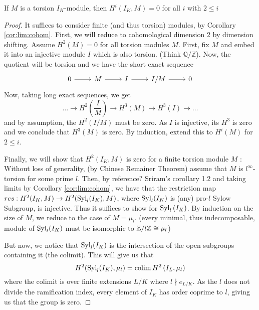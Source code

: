 \begin{proposition} \coproof
		 If \(M\) is a torsion \(I_{K}\)-module, then
			\(H^{i}(I_{K},M) = 0\) for all \(i\) with \(2 \leq i\)
\end{proposition}

\begin{proof}
			It suffices to consider
			finite (and thus torsion) modules, by Corollary \ref{cor:lim:cohom}.
			First, we will reduce to cohomological dimension 2 by dimension
			shifting. 
			Assume \(H^{2}(M) = 0\) for all torsion modules \(M\).
			First, fix \(M\) and embed it into an injective module \(I\) 
			which is also torsion.
			(Think \(\mathbb{Q} / \mathbb{Z}\)).
			Now, the quotient will be torsion and we have the short exact sequence
			\[
			\begin{tikzcd}
			0 \arrow{r}{} & M \arrow{r}{} & 
			I \arrow{r}{} & I / M \arrow{r}{} & 0
			\end{tikzcd}
			\]
			Now, taking long exact sequences, we get
			\[
				\ldots \to H^{2}(\frac{I}{M}) \to 
				H^{3}(M) \to H^{3}(I) \to \ldots
			\] 
			and by assumption, the \(H^{2}(I / M)\) must be zero.
			As \(I\) is injective, its \(H^{3}\) is zero and we conclude
			that \(H^{3}(M)\) is zero. 
			By induction, extend this to \(H^{i}(M)\) for \(2 \leq i\).

			Finally, we will show that \(H^{2}(I_{K},M)\) is zero 
			for a finite torsion module \(M\) :
			Without loss of generality, (by Chinese Remainer Theorem)
			assume that \(M\) is \(l^{\infty}\)-torsion for some prime 
			\(l\).
			Then, by {\color{red} reference?} Sriram's corollary 1.2 and taking limits by
			Corollary \ref{cor:lim:cohom}, we have that the restriction
			map \(res : H^{2}(I_{K},M) \to H^{2}(\operatorname{Syl}_{l}(I_{K}),M)\),
			where \(\operatorname{Syl}_{l}(I_{K})\) is (any) pro-\(l\) Sylow Subgroup,
			is injective. 
			Thus it suffices to show for \(\operatorname{Syl}_{l}\left( I_{K} \right)\).
			By induction on the size of \(M\), we reduce to the case of
			\(M = \mu_{l}\).
			(every minimal, thus indecomposable, module of 
			\(\operatorname{Syl}_{l}(I_{K})\) must be isomorphic to
			\(\mathbb{Z} / l\mathbb{Z} \cong \mu_{l}\))

			But now, we notice that \(\operatorname{Syl}_{l}(I_{K})\) is the intersection
			of the open subgroups containing it (the colimit). 
			This will give us that
			\[
				H^{2}(\operatorname{Syl}_{l}(I_{K}),\mu_{l}) = 
				\operatorname{colim} H^{2}\left( I_{L},\mu_{l} \right)
			\] 
			where the colimit is over finite extensions \(L / K\) where
			\(l \nmid e_{L / K}\).
			As the \(l\) does not divide the ramification index, every
			element of \(I_{K}\) has order coprime to \(l\), giving us that 
			the group is zero.
\end{proof}



